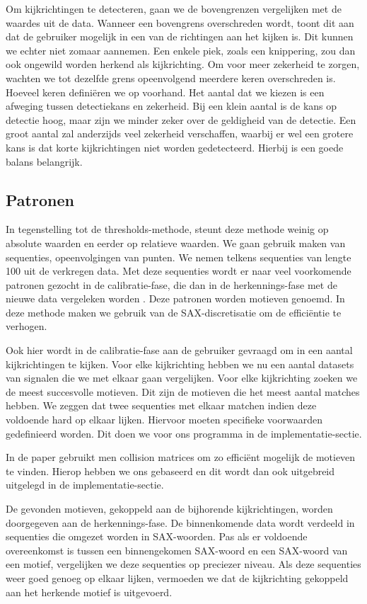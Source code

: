 \documentclass{article}
\begin{document}
Om kijkrichtingen te detecteren, gaan we de bovengrenzen vergelijken met de waardes uit de data. Wanneer een bovengrens overschreden wordt, toont dit aan dat de gebruiker mogelijk in een van de richtingen aan het kijken is. Dit kunnen we echter niet zomaar aannemen. Een enkele piek, zoals een knippering, zou dan ook ongewild worden herkend als kijkrichting. Om voor meer zekerheid te zorgen, wachten we tot dezelfde grens opeenvolgend meerdere keren overschreden is. Hoeveel keren definiëren we op voorhand. Het aantal dat we kiezen is een afweging tussen detectiekans en zekerheid. Bij een klein aantal is de kans op detectie hoog, maar zijn we minder zeker over de geldigheid van de detectie. Een groot aantal zal anderzijds veel zekerheid verschaffen, waarbij er wel een grotere kans is dat korte kijkrichtingen niet worden gedetecteerd. Hierbij is een goede balans belangrijk.

\subsection{Patronen}

In tegenstelling tot de thresholds-methode, steunt deze methode weinig op absolute waarden en eerder op relatieve waarden. We gaan gebruik maken van sequenties, opeenvolgingen van punten. We nemen telkens sequenties van lengte 100 uit de verkregen data.
Met deze sequenties wordt er naar veel voorkomende patronen gezocht in de calibratie-fase, die dan in de herkennings-fase met de nieuwe data vergeleken worden \cite{motifs}. Deze patronen worden motieven genoemd. In deze methode maken we gebruik van de SAX-discretisatie om de efficiëntie te verhogen.

Ook hier wordt in de calibratie-fase aan de gebruiker gevraagd om in een aantal kijkrichtingen te kijken. Voor elke kijkrichting hebben we nu een aantal datasets van signalen die we met elkaar gaan vergelijken. Voor elke kijkrichting zoeken we de meest succesvolle motieven. Dit zijn de motieven die het meest aantal matches hebben. We zeggen dat twee sequenties met elkaar matchen indien deze voldoende hard op elkaar lijken. Hiervoor moeten specifieke voorwaarden gedefinieerd worden. Dit doen we voor ons programma in de implementatie-sectie.

In de paper \cite{motifs} gebruikt men collision matrices om zo efficiënt mogelijk de motieven te vinden. Hierop hebben we ons gebaseerd en dit wordt dan ook uitgebreid uitgelegd in de implementatie-sectie.

De gevonden motieven, gekoppeld aan de bijhorende kijkrichtingen, worden doorgegeven aan de herkennings-fase. De binnenkomende data wordt verdeeld in sequenties die omgezet worden in SAX-woorden. Pas als er voldoende overeenkomst is tussen een binnengekomen SAX-woord en een SAX-woord van een motief, vergelijken we deze sequenties op preciezer niveau. Als deze sequenties weer goed genoeg op elkaar lijken, vermoeden we dat de kijkrichting gekoppeld aan het herkende motief is uitgevoerd.
\end{document}
